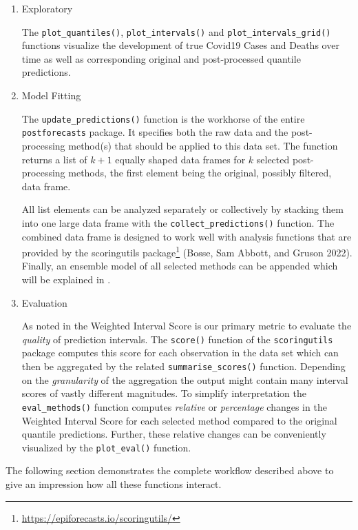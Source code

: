 \documentclass[
]{article}
\DeclareRobustCommand{\href}[2]{#2\footnote{\url{#1}}}
\begin{document}
\begin{enumerate}
\def\labelenumi{\arabic{enumi}.}
\item
  Exploratory

  The \texttt{plot\_quantiles()}, \texttt{plot\_intervals()} and \texttt{plot\_intervals\_grid()} functions visualize the development of true Covid19 Cases and Deaths over time as well as corresponding original and post-processed quantile predictions.
\item
  Model Fitting

  The \texttt{update\_predictions()} function is the workhorse of the entire \texttt{postforecasts} package.
  It specifies both the raw data and the post-processing method(s) that should be applied to this data set.
  The function returns a list of \(k+1\) equally shaped data frames for \(k\) selected post-processing methods, the first element being the original, possibly filtered, data frame.

  All list elements can be analyzed separately or collectively by stacking them into one large data frame with the \texttt{collect\_predictions()} function.
  The combined data frame is designed to work well with analysis functions that are provided by the \href{https://epiforecasts.io/scoringutils/}{scoringutils package} (Bosse, Sam Abbott, and Gruson 2022).
  Finally, an ensemble model of all selected methods can be appended which will be explained in  .
\item
  Evaluation

  As noted in  the Weighted Interval Score is our primary metric to evaluate the \emph{quality} of prediction intervals.
  The \texttt{score()} function of the \texttt{scoringutils} package computes this score for each observation in the data set which can then be aggregated by the related \texttt{summarise\_scores()} function.
  Depending on the \emph{granularity} of the aggregation the output might contain many interval scores of vastly different magnitudes.
  To simplify interpretation the \texttt{eval\_methods()} function computes \emph{relative} or \emph{percentage} changes in the Weighted Interval Score for each selected method compared to the original quantile predictions.
  Further, these relative changes can be conveniently visualized by the \texttt{plot\_eval()} function.
\end{enumerate}

The following section demonstrates the complete workflow described above to give an impression how all these functions interact.
\end{document}
